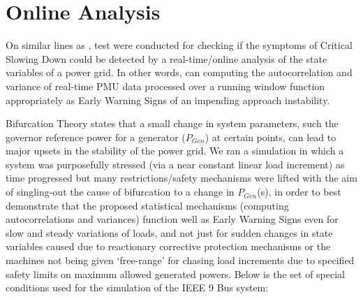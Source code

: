 \section[Online/Real-time Analysis]{Online Analysis}
\label{sec:online}

On similar lines as \cite{ghanvati01, sanchez01}, test were conducted for checking if the symptoms of Critical Slowing Down could  be detected by a real-time/online analysis of the state variables of a power grid. In other words, can computing the autocorrelation and variance of real-time PMU data processed over a running window function appropriately as Early Warning Signs of an impending approach instability.

Bifurcation Theory states that a small change in system parameters, such the governor reference power for a generator ($P_{Gen}$) at certain points, can lead to major upsets in the stability of the power grid. We ran a simulation in which a system was purposefully stressed (via a near constant linear load increment) as time progressed but many restrictions/safety mechanisms were lifted with the aim of singling-out the cause of bifurcation to a change in $P_{Gen}$(s), in order to best demonstrate that the proposed statistical mechanisms (computing autocorrelations and variances) function well as Early Warning Signs even for slow and steady variations of loads, and not just for sudden changes in state variables caused due to reactionary corrective protection mechanisms or the machines not being given `free-range' for chasing load increments due to specified safety limits on maximum allowed generated powers. Below is the set of special conditions used for the simulation of the IEEE 9 Bus system:


